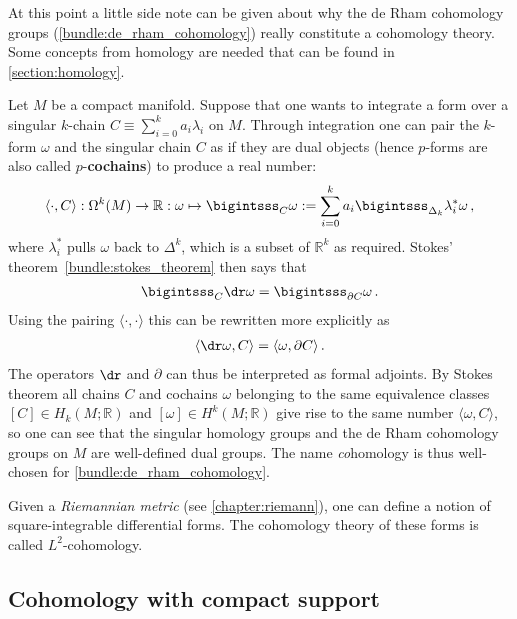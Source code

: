     At this point a little side note can be given about why the de Rham cohomology groups (\cref{bundle:de_rham_cohomology}) really constitute a cohomology theory. Some concepts from homology are needed that can be found in \cref{section:homology}.

    Let $M$ be a compact manifold. Suppose that one wants to integrate a form over a singular $k$-chain $C\equiv\sum_{i=0}^ka_i\lambda_i$ on $M$. Through integration one can pair the $k$-form $\omega$ and the singular chain $C$ as if they are dual objects (hence $p$-forms are also called $p$-\textbf{cochains}) to produce a real number:
    \begin{gather}
        \langle\cdot,C\rangle:\Omega^k(M)\rightarrow\mathbb{R}:\omega\mapsto\bigintsss_C\omega := \sum_{i=0}^ka_i\bigintsss_{\Delta_k}\lambda_i^*\omega\,,
    \end{gather}
    where $\lambda_i^*$ pulls $\omega$ back to $\Delta^k$, which is a subset of $\mathbb{R}^k$ as required. Stokes' theorem~\ref{bundle:stokes_theorem} then says that
    \begin{gather}
        \bigintsss_C\dr\omega = \bigintsss_{\partial C}\omega\,.
    \end{gather}
    Using the pairing $\langle\cdot,\cdot\rangle$ this can be rewritten more explicitly as
    \begin{gather}
        \langle\dr\omega,C \rangle = \langle\omega,\partial C\rangle\,.
    \end{gather}
    The operators $\dr$ and $\partial$ can thus be interpreted as formal adjoints. By Stokes theorem all chains $C$ and cochains $\omega$ belonging to the same equivalence classes $[C]\in H_k(M;\mathbb{R})$ and $[\omega]\in H^k(M;\mathbb{R})$ give rise to the same number $\langle\omega,C\rangle$, so one can see that the singular homology groups and the de Rham cohomology groups on $M$ are well-defined dual groups. The name \textit{co}homology is thus well-chosen for \cref{bundle:de_rham_cohomology}.

    \begin{remark}[$L^2$-cohomology]
        Given a \textit{Riemannian metric} (see \cref{chapter:riemann}), one can define a notion of square-integrable differential forms. The cohomology theory of these forms is called $L^2$-cohomology.
    \end{remark}

\subsection{Cohomology with compact support}\label{section:compact_cohomology}

